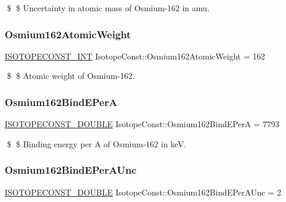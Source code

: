 \$ \$ Uncertainty in atomic mass of Osmium-\/162 in amu. \mbox{\label{group___isotope_const-_osmium-_os162_ga187e7065314679c920acaadea97a8a08}} 
\subsubsection{\texorpdfstring{Osmium162\+Atomic\+Weight}{Osmium162AtomicWeight}}
{\footnotesize\ttfamily \mbox{\hyperlink{group___isotope_const-_macros_ga5f18360b3e99483a35c32d789e62621c}{I\+S\+O\+T\+O\+P\+E\+C\+O\+N\+S\+T\+\_\+\+I\+NT}} Isotope\+Const\+::\+Osmium162\+Atomic\+Weight = 162}

\$ \$ Atomic weight of Osmium-\/162. \mbox{\label{group___isotope_const-_osmium-_os162_gada07f9866b3b60d0db6950d16f592d52}} 
\subsubsection{\texorpdfstring{Osmium162\+Bind\+E\+PerA}{Osmium162BindEPerA}}
{\footnotesize\ttfamily \mbox{\hyperlink{group___isotope_const-_macros_ga8f45a7272ce02c0b4c65c44636ed719a}{I\+S\+O\+T\+O\+P\+E\+C\+O\+N\+S\+T\+\_\+\+D\+O\+U\+B\+LE}} Isotope\+Const\+::\+Osmium162\+Bind\+E\+PerA = 7793}

\$ \$ Binding energy per A of Osmium-\/162 in keV. \mbox{\label{group___isotope_const-_osmium-_os162_ga4e89763ce2357223687c89bb7e5532b8}} 
\subsubsection{\texorpdfstring{Osmium162\+Bind\+E\+Per\+A\+Unc}{Osmium162BindEPerAUnc}}
{\footnotesize\ttfamily \mbox{\hyperlink{group___isotope_const-_macros_ga8f45a7272ce02c0b4c65c44636ed719a}{I\+S\+O\+T\+O\+P\+E\+C\+O\+N\+S\+T\+\_\+\+D\+O\+U\+B\+LE}} Isotope\+Const\+::\+Osmium162\+Bind\+E\+Per\+A\+Unc = 2}

